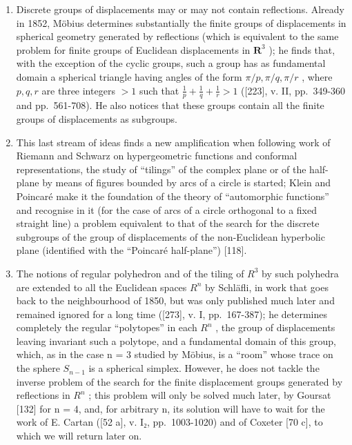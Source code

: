 \begin{enumerate}
\def\labelenumi{\arabic{enumi}.}
\setcounter{enumi}{1}
\item
  Discrete groups of displacements may or may not contain reflections. Already in 1852, Möbius determines substantially the finite groups of displacements in spherical geometry generated by reflections (which is equivalent to the same problem for finite groups of Euclidean displacements in \(\mathbf{R}^3\) ); he finds that, with the exception of the cyclic groups, such a group has as fundamental domain a spherical triangle having angles of the form \(\pi / p, \pi / q, \pi / r\) , where \(p, q, r\) are three integers \(>1\) such that \(\frac{1}{p} + \frac{1}{q} + \frac{1}{r} > 1\) ({[}223{]}, v. II, pp.~349-360 and pp.~561-708). He also notices that these groups contain all the finite groups of displacements as subgroups.
\item
  This last stream of ideas finds a new amplification when following work of Riemann and Schwarz on hypergeometric functions and conformal representations, the study of ``tilings'' of the complex plane or of the half-plane by means of figures bounded by arcs of a circle is started; Klein and Poincaré make it the foundation of the theory of ``automorphic functions'' and recognise in it (for the case of arcs of a circle orthogonal to a fixed straight line) a problem equivalent to that of the search for the discrete subgroups of the group of displacements of the non-Euclidean hyperbolic plane (identified with the ``Poincaré half-plane'') {[}118{]}.
\item
  The notions of regular polyhedron and of the tiling of \(R^{3}\) by such polyhedra are extended to all the Euclidean spaces \(R^{n}\) by Schläfli, in work that goes back to the neighbourhood of 1850, but was only published much later and remained ignored for a long time ({[}273{]}, v. I, pp.~167-387); he determines completely the regular ``polytopes'' in each \(R^{n}\) , the group of displacements leaving invariant such a polytope, and a fundamental domain of this group, which, as in the case n = 3 studied by Möbius, is a ``room'' whose trace on the sphere \(S_{n-1}\) is a spherical simplex. However, he does not tackle the inverse problem of the search for the finite displacement groups generated by reflections in \(R^{n}\) ; this problem will only be solved much later, by Goursat {[}132{]} for n = 4, and, for arbitrary n, its solution will have to wait for the work of E. Cartan ({[}52 a{]}, v. I₂, pp.~1003-1020) and of Coxeter {[}70 c{]}, to which we will return later on.
\end{enumerate}

